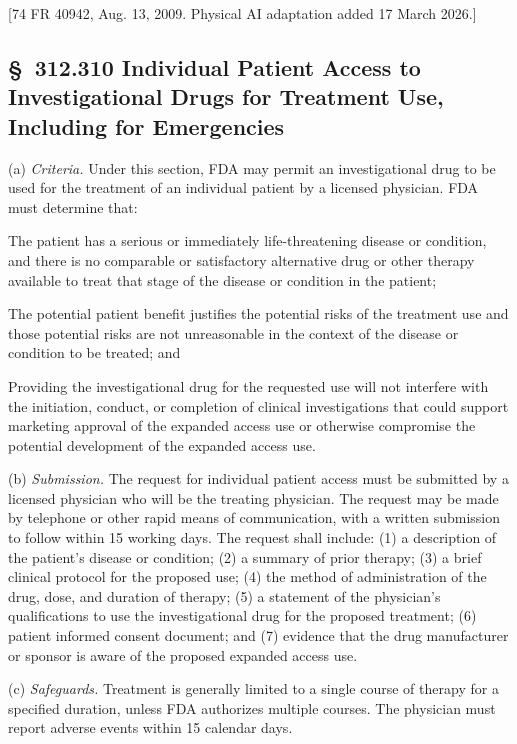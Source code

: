 \documentclass[11pt]{article}
\begin{document}
[74 FR 40942, Aug. 13, 2009. Physical AI adaptation added 17 March 2026.]

\subsection{\S~312.310 Individual Patient Access to Investigational Drugs for Treatment Use, Including for Emergencies}

(a) \textit{Criteria.} Under this section, FDA may permit an investigational drug to be used for the treatment of an individual patient by a licensed physician. FDA must determine that:

\begin{description}[leftmargin=0.5cm,style=sameline]
\item[(1)] The patient has a serious or immediately life-threatening disease or condition, and there is no comparable or satisfactory alternative drug or other therapy available to treat that stage of the disease or condition in the patient;
\item[(2)] The potential patient benefit justifies the potential risks of the treatment use and those potential risks are not unreasonable in the context of the disease or condition to be treated; and
\item[(3)] Providing the investigational drug for the requested use will not interfere with the initiation, conduct, or completion of clinical investigations that could support marketing approval of the expanded access use or otherwise compromise the potential development of the expanded access use.
\end{description}

(b) \textit{Submission.} The request for individual patient access must be submitted by a licensed physician who will be the treating physician. The request may be made by telephone or other rapid means of communication, with a written submission to follow within 15 working days. The request shall include: (1) a description of the patient's disease or condition; (2) a summary of prior therapy; (3) a brief clinical protocol for the proposed use; (4) the method of administration of the drug, dose, and duration of therapy; (5) a statement of the physician's qualifications to use the investigational drug for the proposed treatment; (6) patient informed consent document; and (7) evidence that the drug manufacturer or sponsor is aware of the proposed expanded access use.

(c) \textit{Safeguards.} Treatment is generally limited to a single course of therapy for a specified duration, unless FDA authorizes multiple courses. The physician must report adverse events within 15 calendar days.
\end{document}
